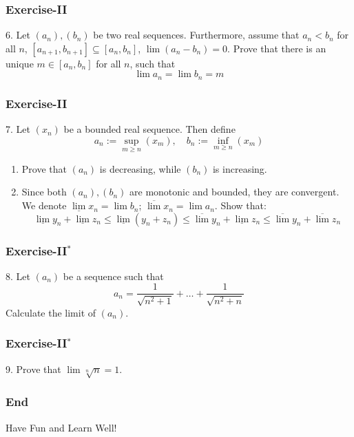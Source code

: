 \documentclass[12pt, t]{beamer}
\begin{document}
\begin{frame}
    \frametitle{Exercise-II}
    6. Let $(a_n),(b_n)$ be two real sequences. Furthermore, assume that $a_n<b_n$
    for all $n$, $[a_{n+1}, b_{n+1}]\subseteq [a_n,b_n]$, $\lim (a_n-b_n)=0$. Prove that there
    is an unique $m\in [a_n,b_n]$ for all $n$, such that
    \begin{equation*}
        \lim a_n=\lim b_n=m
    \end{equation*}
\end{frame}


\begin{frame}
    \frametitle{Exercise-II}
    7. Let $(x_n)$ be a bounded real sequence. Then define
    \begin{equation*}
        a_n:=\sup_{m\geq n}(x_m),\quad b_n:=\inf_{m\geq n}(x_m)
    \end{equation*}

    \begin{enumerate}
        \item Prove that $(a_n)$ is decreasing, while $(b_n)$ is increasing.
        \item Since both $(a_n),(b_n)$ are monotonic and bounded, they are convergent.
              We denote $\underline{\lim} x_n=\lim b_n$; $\overline{\lim}x_n=\lim a_n$. Show that:
              \begin{equation*}
                  \underline{\lim}y_n+\underline{\lim}z_n\leq \underline{\lim} (y_n+z_n)\leq\overline{\lim}y_n+\underline{\lim}z_n\leq\overline{\lim}y_n+\overline{\lim}z_n
              \end{equation*}
    \end{enumerate}
\end{frame}

\begin{frame}
    \frametitle{Exercise-II$^*$}
    8. Let $(a_n)$ be a sequence such that
    \begin{equation*}
        a_n=\frac{1}{\sqrt{n^2+1}}+\dots+\frac{1}{\sqrt{n^2+n}}
    \end{equation*}
    Calculate the limit of $(a_n)$.
\end{frame}

\begin{frame}
    \frametitle{Exercise-II$^*$}
    9. Prove that $\lim \sqrt[n]{n}=1$.
\end{frame}

\begin{frame}
    \frametitle{End}
    \vspace{2cm}
    \Huge \center  Have Fun and Learn Well!
\end{frame}
\end{document}
